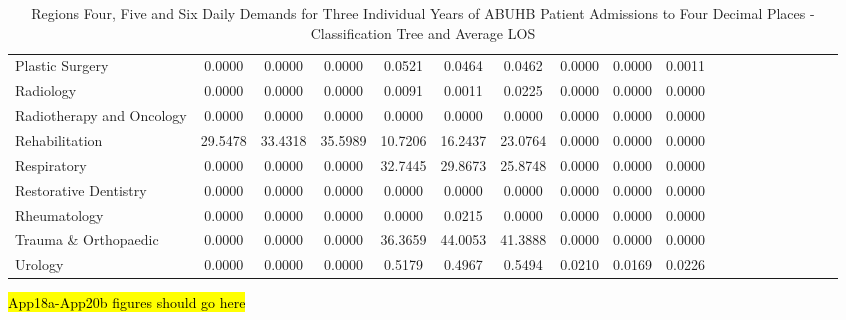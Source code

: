\documentclass[thesis.tex]{subfiles}
\begin{document}
\begin{landscape}
\begin{table}[h!]
{\begin{tabular}{lcccccccccccccccccc}
Plastic Surgery	&0.0000&	0.0000&	0.0000&	0.0521&	0.0464&	0.0462&	0.0000&	0.0000&	0.0011\\
Radiology&	0.0000&	0.0000&	0.0000&	0.0091&	0.0011&	0.0225&	0.0000&	0.0000&	0.0000\\
Radiotherapy and Oncology&	0.0000&	0.0000&	0.0000&	0.0000&	0.0000&	0.0000&	0.0000&	0.0000&	0.0000\\
Rehabilitation&	29.5478&	33.4318&	35.5989&	10.7206&	16.2437&	23.0764&	0.0000&	0.0000&	0.0000\\
Respiratory&	0.0000&	0.0000&	0.0000&	32.7445&	29.8673&	25.8748&	0.0000&	0.0000&	0.0000\\
Restorative Dentistry	&0.0000&	0.0000&	0.0000&	0.0000&	0.0000&	0.0000&	0.0000&	0.0000&	0.0000\\
Rheumatology&	0.0000&	0.0000&	0.0000&	0.0000&	0.0215&	0.0000&	0.0000&	0.0000&	0.0000\\
Trauma \& Orthopaedic&	0.0000&	0.0000&	0.0000&	36.3659&	44.0053&	41.3888&	0.0000&	0.0000&	0.0000\\
Urology&	0.0000&	0.0000&	0.0000&	0.5179&	0.4967&	0.5494&	0.0210&	0.0169&	0.0226\\
\bottomrule
\end{tabular}  } 
\caption{Regions Four, Five and Six Daily Demands for Three Individual Years of ABUHB Patient Admissions to Four Decimal Places - Classification Tree and Average LOS}
    \label{apptab:LinkedDemands8b}
\end{table}

    
\end{landscape}
\hl{App18a-App20b figures should go here}
\end{document}
